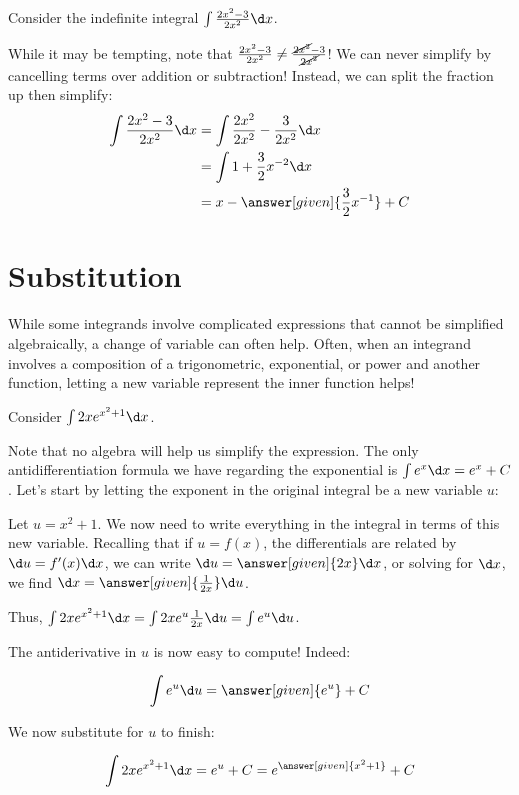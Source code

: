 \documentclass[nooutcomes]{ximera}
\begin{document}
\begin{example}
Consider the indefinite integral $\int \frac{2x^2-3}{2x^2} \d x$.  

While it may be tempting, note that $\frac{2x^2-3}{2x^2} \neq \frac{\cancel{2x^2}-3}{\cancel{2x^2}}$!  We can never simplify by cancelling terms over addition or subtraction!  Instead, we can split the fraction up then simplify: 
\begin{align*}
\int \frac{2x^2-3}{2x^2} \d x &=\int \frac{2x^2}{2x^2}-\frac{3}{2x^2} \d x \\
&=  \int 1+\frac{3}{2}x^{-2} \d x \\
&= x- \answer[given]{\frac{3}{2}x^{-1}}+C
\end{align*}

\end{example}

  
\section{Substitution}

While some integrands involve complicated expressions that cannot be simplified algebraically, a change of variable can often help. Often, when an integrand involves a composition of a trigonometric, exponential, or power and another function, letting a new variable represent the inner function helps!

\begin{example}
Consider $\int 2x e^{x^2+1} \d x$.  

Note that no algebra will help us simplify the expression.  The only antidifferentiation formula we have regarding the exponential is $\int e^x \d x = e^x +C$.  Let's start by letting the exponent in the original integral be a new variable $u$:

Let $u= x^2+1$.  We now need to write everything in the integral in terms of this new variable.  Recalling that if $u = f(x)$, the differentials are related by $\d u = f'(x) \d x$, we can write $\d u = \answer[given]{2x} \d x$, or solving for $\d x$, we find $\d x = \answer[given]{\frac{1}{2x}} \d u$.

Thus, $\int 2x e^{x^2+1} \d x = \int 2x e^{u} \frac{1}{2x} \d u = \int e^u \d u$.

The antiderivative in $u$ is now easy to compute!  Indeed:

\[ \int e^u \d u = \answer[given]{e^u}+C \]

We now substitute for $u$ to finish:

\[\int 2xe^{x^2+1} \d x = e^u+C = e^{\answer[given]{x^2+1}}+C \]

\end{example}
\end{document}
